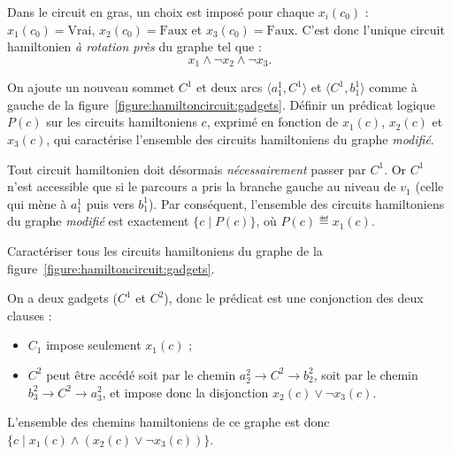 \begin{exercice}[\textsc{Circuit Hamiltonien} est NP-complet%
    \footnote{Vidéo détaillée de la réduction de \textsc{3-SAT} à \textsc{Cycle Hamiltonien} : \url{https://www.youtube.com/watch?v=OHnX-R_SBpM}}]
  \begin{figure}[h!]%
    \centering
    \reduction%
    \gadget%
  \end{figure}

  \begin{corrections}
    Dans le circuit en gras, un choix est imposé pour chaque $x_i(c_0)$ :
    $x_1(c_0)=\text{Vrai}$, $x_2(c_0)=\text{Faux}$ et $x_3(c_0)=\text{Faux}$.
    C'est donc l'unique circuit hamiltonien \emph{à rotation près} du graphe tel que :
    $$ x_1 \land \lnot x_2 \land \lnot x_3.$$
  \end{corrections}
  
  \begin{questions}
  \item On ajoute un nouveau sommet $C^1$ et deux arcs $\langle a_1^1, C^1\rangle$ et $\langle C^1, b_1^1\rangle$
    comme à gauche de la figure~\ref{figure:hamiltoncircuit:gadgets}.
    Définir un prédicat logique $P(c)$ sur les circuits hamiltoniens $c$,
    exprimé en fonction de $x_1(c)$, $x_2(c)$ et $x_3(c)$,
    qui caractérise l'ensemble des circuits hamiltoniens du graphe \emph{modifié}. 
  \end{questions}
  \begin{corrections}
    Tout circuit hamiltonien doit désormais \emph{nécessairement} passer par $C^1$.
    Or $C^1$ n'est accessible que si le parcours a pris la branche gauche au niveau de $v_1$ (celle qui mène à $a_1^1$ puis vers $b_1^1$).  
    Par conséquent, l’ensemble des circuits hamiltoniens du graphe \emph{modifié} est exactement $\{c \mid P(c) \}$, où $P(c)  \eqdef x_1(c)$. 
  \end{corrections}

  \begin{questions}
  \item Caractériser tous les circuits hamiltoniens du graphe de la figure~\ref{figure:hamiltoncircuit:gadgets}. 
  \end{questions}
  \begin{corrections}
    On a deux gadgets ($C^1$ et $C^2$), donc le prédicat est une conjonction des deux clauses : 
    \begin{itemize}
    \item $C_1$ impose seulement $x_1(c)$ ;
    \item $C^2$ peut être accédé soit par le chemin $a_2^2 \to C^2 \to b_2^2$, soit par le chemin $b_3^2 \to C^2 \to a_3^2$,
      et impose donc la disjonction $x_2(c) \lor \lnot x_3(c)$. 
    \end{itemize}
    L'ensemble des chemins hamiltoniens de ce graphe est donc $\{ c \mid x_1(c) \land (x_2(c) \lor \lnot x_3(c))\}$.
  \end{corrections}


\end{exercice}
